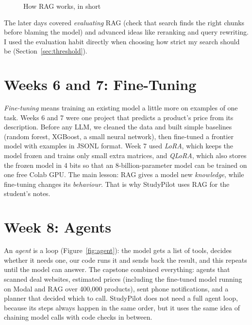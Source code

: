 \documentclass[12pt,a4paper]{report}
\begin{document}
\begin{figure}[H]
\centering
{}
\caption{How RAG works, in short}\label{fig:rag}
\end{figure}

The later days covered \emph{evaluating} RAG (check that search finds the right chunks
before blaming the model) and advanced ideas like reranking and query rewriting. I used the
evaluation habit directly when choosing how strict my search should be
(Section~\ref{sec:threshold}).

\section{Weeks 6 and 7: Fine-Tuning}
\emph{Fine-tuning} means training an existing model a little more on examples of one task.
Weeks 6 and 7 were one project that predicts a product's price from its description. Before
any LLM, we cleaned the data and built simple baselines (random forest, XGBoost, a small
neural network), then fine-tuned a frontier model with examples in JSONL format. Week 7 used
\emph{LoRA}, which keeps the model frozen and trains only small extra matrices, and
\emph{QLoRA}, which also stores the frozen model in 4 bits so that an 8-billion-parameter
model can be trained on one free Colab GPU. The main lesson: RAG gives a model new
\emph{knowledge}, while fine-tuning changes its \emph{behaviour}. That is why StudyPilot uses
RAG for the student's notes.

\section{Week 8: Agents}
An \emph{agent} is a loop (Figure~\ref{fig:agent}): the model gets a list of tools, decides
whether it needs one, our code runs it and sends back the result, and this repeats until the
model can answer. The capstone combined everything: agents that scanned deal websites,
estimated prices (including the fine-tuned model running on Modal and RAG over 400,000
products), sent phone notifications, and a planner that decided which to call. StudyPilot
does not need a full agent loop, because its steps always happen in the same order, but it
uses the same idea of chaining model calls with code checks in between.
\end{document}
